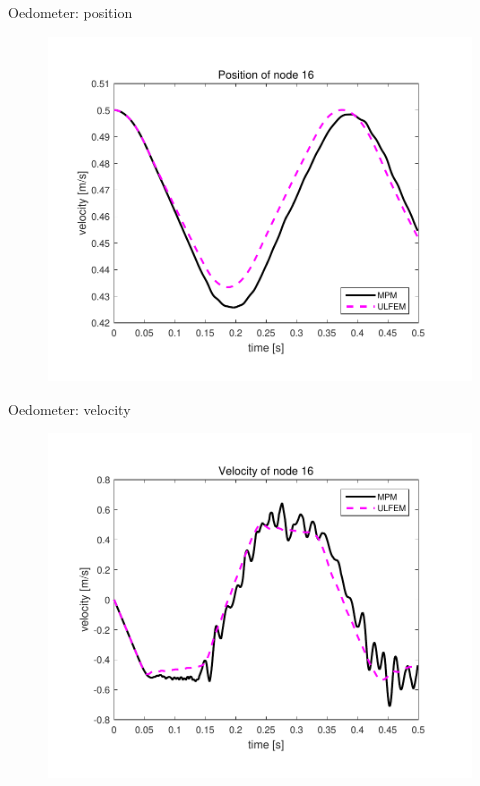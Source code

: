 \documentclass[mathserif,professionalfont]{beamer}
\begin{document}
\begin{frame}{Oedometer: position}
\begin{figure}
\includegraphics[scale=0.5]{images/oedometer_pos_30_10}
\end{figure}
\end{frame}

\begin{frame}{Oedometer: velocity}
\begin{figure}
\includegraphics[scale=0.5]{images/oedometer_vel_30_10}
\end{figure}
\end{frame}
\end{document}
